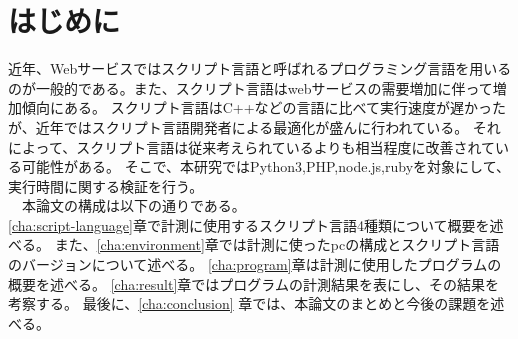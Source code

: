 \chapter{はじめに}
\label{cha:intro}
近年、Webサービスではスクリプト言語と呼ばれるプログラミング言語を用いるのが一般的である。また、スクリプト言語はwebサービスの需要増加に伴って増加傾向にある。
スクリプト言語はC++などの言語に比べて実行速度が遅かったが、近年ではスクリプト言語開発者による最適化が盛んに行われている。
それによって、スクリプト言語は従来考えられているよりも相当程度に改善されている可能性がある。
そこで、本研究ではPython3,PHP,node.js,rubyを対象にして、実行時間に関する検証を行う。\\
　本論文の構成は以下の通りである。\\
\ref{cha:script-language}章で計測に使用するスクリプト言語4種類について概要を述べる。
また、\ref{cha:environment}章では計測に使ったpcの構成とスクリプト言語のバージョンについて述べる。
\ref{cha:program}章は計測に使用したプログラムの概要を述べる。
\ref{cha:result}章ではプログラムの計測結果を表にし、その結果を考察する。
最後に、\ref{cha:conclusion} 章では、本論文のまとめと今後の課題を述べる。